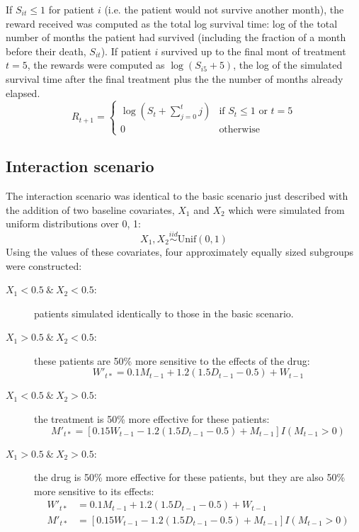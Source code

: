 \documentclass[12pt]{article}
\begin{document}
If $S_{it} \leq 1$ for patient $i$ (i.e. the patient would not survive another month), the reward received was computed as the total log survival time: log of the total number of months the patient had survived (including the fraction of a month before their death, $S_{it}$). If patient $i$ survived up to the final mont of treatment $t = 5$, the rewards were computed as $\log(S_{i5} + 5)$, the log of the simulated survival time after the final treatment plus the the number of months already elapsed. 
\begin{equation}
  R_{t + 1} = \begin{cases}
    \log(S_{t} + \sum_{j = 0}^{t} j) & \text{if } S_{t} \leq 1 \text{ or } t = 5 \\
    0 & \text{otherwise}
  \end{cases}
\end{equation}



\subsection{Interaction scenario} %
\label{sub:subgroups_interaction}

The interaction scenario was identical to the basic scenario just described with the addition of two baseline covariates, $X_{1}$ and $X_{2}$ which were simulated from uniform distributions over 0, 1:
\begin{equation}
  X_{1}, X_{2} \overset{iid}{\sim} \text{Unif}(0, 1) 
\end{equation}
Using the values of these covariates, four approximately equally sized subgroups were constructed:
\begin{description}
  \item [$X_{1} < 0.5 \ \& \ X_{2} < 0.5$:] patients simulated identically to those in the basic scenario.
  \item [$X_{1} > 0.5 \ \& \ X_{2} < 0.5$:] these patients are 50\% more sensitive to the effects of the drug:
   \begin{equation}
   W'_{t*} = 0.1 M_{t-1} + 1.2 (1.5 D_{t-1} - 0.5) + W_{t - 1}
   \end{equation}
   \item [$X_{1} < 0.5 \ \& \ X_{2} > 0.5$:] the treatment is 50\% more effective for these patients:
\begin{equation}
M'_{t*} = [0.15 W_{t-1} - 1.2 (1.5 D_{t-1} - 0.5) + M_{t - 1}] I(M_{t-1} > 0)
\end{equation}
   \item [$X_{1} > 0.5 \ \& \ X_{2} > 0.5$:] the drug is 50\% more effective for these patients, but they are also 50\% more sensitive to its effects:
   \begin{align}
   W'_{t*} &= 0.1 M_{t-1} + 1.2 (1.5 D_{t-1} - 0.5) + W_{t - 1} \\
   M'_{t*} &= [0.15 W_{t-1} - 1.2 (1.5 D_{t-1} - 0.5) + M_{t - 1}] I(M_{t-1} > 0)
   \end{align}
\end{description}
\end{document}

